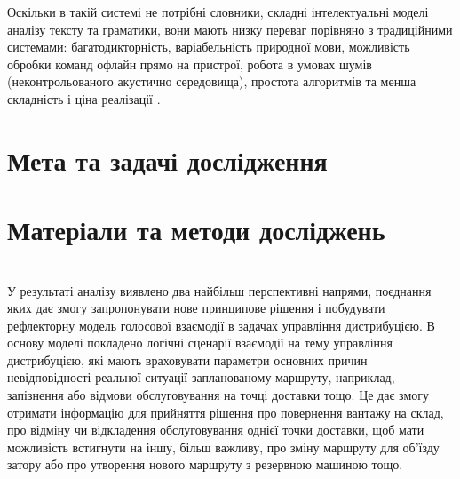 Оскільки в такій системі не потрібні словники, складні інтелектуальні моделі аналізу тексту та граматики, вони мають низку переваг порівняно з традиційними системами: багатодикторність, варіабельність природної мови, можливість обробки команд офлайн прямо на пристрої, робота в умовах шумів (неконтрольованого акустично середовища), простота алгоритмів та менша складність і ціна реалізації \cite{Teslia_2013}.


\section{Мета та задачі дослідження}



\section{Матеріали та методи досліджень}

\section{}
У результаті аналізу виявлено два найбільш перспективні напрями, поєднання яких дає змогу запропонувати нове принципове рішення і побудувати рефлекторну модель голосової взаємодії в задачах управління дистрибуцією. В основу моделі покладено логічні сценарії взаємодії на тему управління дистрибуцією, які мають враховувати параметри основних причин невідповідності реальної ситуації запланованому маршруту, наприклад, запізнення або відмови обслуговування на точці доставки тощо. Це дає змогу отримати інформацію для прийняття рішення про повернення вантажу на склад, про відміну чи відкладення обслуговування однієї точки доставки, щоб мати можливість встигнути на іншу, більш важливу, про зміну маршруту для об’їзду затору або про утворення нового маршруту з резервною машиною тощо.

